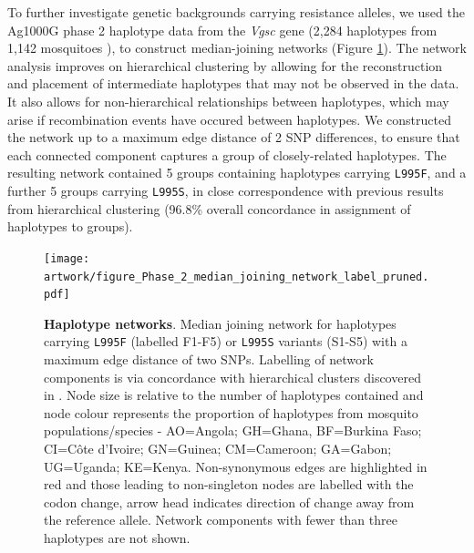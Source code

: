 \documentclass[a4paper,11pt,abstracton,hidelinks]{scrartcl}
\begin{document}
%
To further investigate genetic backgrounds carrying resistance alleles, we used the Ag1000G phase 2 haplotype data from the \textit{Vgsc} gene (2,284 haplotypes from 1,142 mosquitoes \cite{clarkson2019genome}), to construct median-joining networks \cite{Bandelt1999} (Figure \ref{fig:networks}).
%
The network analysis improves on hierarchical clustering by allowing for the reconstruction and placement of intermediate haplotypes that may not be observed in the data.
%
It also allows for non-hierarchical relationships between haplotypes, which may arise if recombination events have occured between haplotypes.
%
We constructed the network up to a maximum edge distance of 2 SNP differences, to ensure that each connected component captures a group of closely-related haplotypes.
%
The resulting network contained 5 groups containing haplotypes carrying \texttt{L995F}, and a further 5 groups carrying \texttt{L995S}, in close correspondence with previous results from hierarchical clustering (96.8\% overall concordance in assignment of haplotypes to groups).
%


%
\begin{figure}[!t]
  \texttt{[image: artwork/figure\_Phase\_2\_median\_joining\_network\_label\_pruned.pdf]}
  \caption{\textbf{Haplotype networks}. Median joining network for haplotypes carrying \texttt{L995F} (labelled F1-F5) or \texttt{L995S} variants (S1-S5) with a maximum edge distance of two SNPs. Labelling of network components is via concordance with hierarchical clusters discovered in \cite{Ag1000gConsortium2017}. Node size is relative to the number of haplotypes contained and node colour represents the proportion of haplotypes from mosquito populations/species - AO=Angola; GH=Ghana, BF=Burkina Faso; CI=C\^{o}te d'Ivoire; GN=Guinea; CM=Cameroon; GA=Gabon; UG=Uganda; KE=Kenya. Non-synonymous edges are highlighted in red and those leading to non-singleton nodes are labelled with the codon change, arrow head indicates direction of change away from the reference allele. Network components with fewer than three haplotypes are not shown.}
  \label{fig:networks}
\end{figure}
\end{document}
